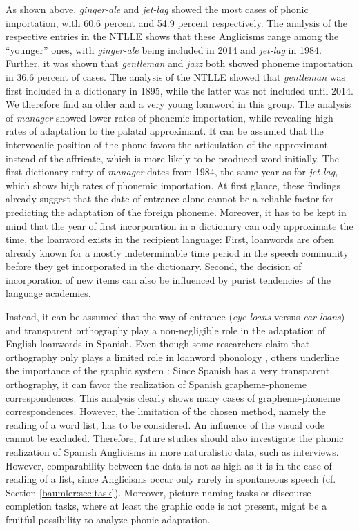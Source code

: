 \documentclass[output=paper]{langscibook}
\begin{document}
As shown above, \textit{ginger-ale} and \textit{jet-lag} showed the most cases of phonic importation, with 60.6 percent and 54.9 percent respectively. The analysis of the respective entries in the \gls*{NTLLE} shows that these Anglicisms range among the “younger” ones, with \textit{ginger-ale} being included in 2014 and \textit{jet-lag} in 1984. Further, it was shown that \textit{gentleman} and \textit{jazz} both showed phoneme importation in 36.6 percent of cases. The analysis of the \gls*{NTLLE} showed that \textit{gentleman} was first included in a dictionary in 1895, while the latter was not included until 2014. We therefore find an older and a very young loanword in this group. The analysis of \textit{manager} showed lower rates of phonemic importation, while revealing high rates of adaptation to the palatal approximant. It can be assumed that the intervocalic position of the phone favors the articulation of the approximant instead of the affricate, which is more likely to be produced word initially. The first dictionary entry of \textit{manager} dates from 1984, the same year as for \textit{jet-lag,} which shows high rates of phonemic importation. At first glance, these findings already suggest that the date of entrance alone cannot be a reliable factor for predicting the adaptation of the foreign phoneme. Moreover, it has to be kept in mind that the year of first incorporation in a dictionary can only approximate the time, the loanword exists in the recipient language: First, loanwords are often already known for a mostly indeterminable time period in the speech community before they get incorporated in the dictionary. Second, the decision of incorporation of new items can also be influenced by purist tendencies of the language academies.

Instead, it can be assumed that the way of entrance (\textit{eye loans} versus \textit{ear loans}) and transparent orthography play a non-negligible role in the adaptation of English loanwords in Spanish. Even though some researchers claim that orthography only plays a limited role in loanword phonology \citep[241]{LaCharite2005}, others underline the importance of the graphic system \citetext{\citealp[505]{Pustka2021}; \citealp[]{Vendelin2006}; \citealp[369]{Peperkamp2003}}: Since Spanish has a very transparent orthography, it can favor the realization of Spanish grapheme-phoneme correspondences. This analysis clearly shows many cases of grapheme-phoneme correspondences. However, the limitation of the chosen method, namely the reading of a word list, has to be considered. An influence of the visual code cannot be excluded.
Therefore, future studies should also investigate the phonic realization of Spanish Anglicisms in more naturalistic data, such as interviews. However, comparability between the data is not as high as it is in the case of reading of a list, since Anglicisms occur only rarely in spontaneous speech (cf. Section \ref{baumler:sec:task}). Moreover, picture naming tasks or discourse completion tasks, where at least the graphic code is not present, might be a fruitful possibility to analyze phonic adaptation. 
\end{document}

